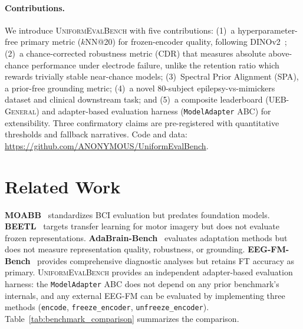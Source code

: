 \documentclass{article}
\newcommand{\bench}{\textsc{UniformEvalBench}\xspace}
\newcommand{\cdr}{\textsc{CDR}\xspace}
\newcommand{\spa}{\textsc{SPA}\xspace}
\newcommand{\uebgen}{\textsc{UEB-General}\xspace}
\newcommand{\codeurl}{\url{https://github.com/ANONYMOUS/UniformEvalBench}}
\begin{document}
\paragraph{Contributions.}
We introduce \bench with five contributions: (1)~a hyperparameter-free primary metric ($k$NN@20) for frozen-encoder quality, following DINOv2~\citep{oquab2023dinov2}; (2)~a chance-corrected robustness metric (\cdr) that measures absolute above-chance performance under electrode failure, unlike the retention ratio which rewards trivially stable near-chance models; (3)~Spectral Prior Alignment (\spa), a prior-free grounding metric; (4)~a novel 80-subject epilepsy-vs-mimickers dataset and clinical downstream task; and (5)~a composite leaderboard (\uebgen) and adapter-based evaluation harness (\texttt{ModelAdapter} ABC) for extensibility. Three confirmatory claims are pre-registered with quantitative thresholds and fallback narratives. Code and data: \codeurl.

\section{Related Work}
\label{sec:related}

\textbf{MOABB}~\citep{jayaram2018moabb} standardizes BCI evaluation but predates foundation models. \textbf{BEETL}~\citep{wei2022beetl} targets transfer learning for motor imagery but does not evaluate frozen representations. \textbf{AdaBrain-Bench}~\citep{chen2025adabrain} evaluates adaptation methods but does not measure representation quality, robustness, or grounding. \textbf{EEG-FM-Bench}~\citep{xiong2026eegfmbench} provides comprehensive diagnostic analyses but retains FT accuracy as primary. \bench provides an independent adapter-based evaluation harness: the \texttt{ModelAdapter} ABC does not depend on any prior benchmark's internals, and any external EEG-FM can be evaluated by implementing three methods (\texttt{encode}, \texttt{freeze\_encoder}, \texttt{unfreeze\_encoder}). Table~\ref{tab:benchmark_comparison} summarizes the comparison.
\end{document}
